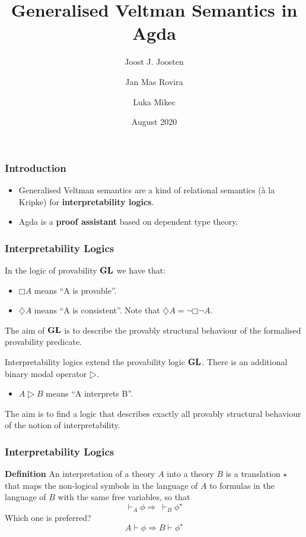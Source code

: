 \documentclass{beamer}
\title{Generalised Veltman Semantics in Agda}
\author{Joost J. Joosten\inst{1} \and Jan Mas Rovira\inst{1}\and Luka Mikec\inst{2}}
\institute[shortinst]{\inst{1} University of Barcelona \and %
  \inst{2} University of Zagreb}
\date{August 2020}
\newcommand{\gl}{\ensuremath{\textup{\textbf{GL}}}\xspace}
\begin{document}
\frame{\titlepage}

\begin{frame}
  \frametitle{Introduction}
  \begin{itemize}
  \item Generalised Veltman semantics are a kind of relational semantics (à la
    Kripke) for \textbf{interpretability logics}. \break \pause
    \item Agda is a \textbf{proof assistant} based on dependent type theory.
  \end{itemize}
\end{frame}

\begin{frame}
  \frametitle{Interpretability Logics}
  In the logic of provability \gl we have that:
  \begin{itemize}
    \item $□A$ means ``A is provable''.
    \item $♢A$ means ``A is consistent''. Note that $♢A=¬□¬A$.
  \end{itemize}
  The aim of \gl is to describe the provably structural behaviour of the
  formalised provability predicate.

  \pause \vspace{0.5cm}

  Interpretability logics extend the provability logic \gl. There is an
  additional binary modal operator $▷$.
  \begin{itemize}
  \item $A▷B$ means ``A interprets B''.
  \end{itemize}
  The aim is to find a logic that describes exactly all provably structural
  behaviour of the notion of interpretability.
\end{frame}

\begin{frame}
  \frametitle{Interpretability Logics}
  \textbf{Definition}
  An interpretation of a theory $A$ into a theory $B$ is a translation $⋆$ that
  maps the non-logical symbols in the language of $A$ to formulas in the
  language of $B$ with the same free variables, so that
  \[⊢_Aϕ⇒\ ⊢_Bϕ^⋆\]
  Which one is preferred?
  \[A⊢ϕ⇒ B⊢ϕ^⋆\]
\end{frame}
\end{document}
